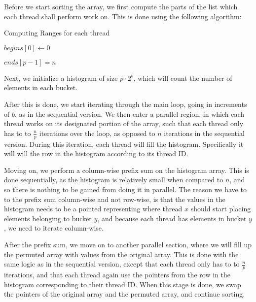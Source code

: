 \documentclass{article}
\begin{document}
Before we start sorting the array, we first compute the parts of the list which each thread shall perform work on. This is done using the following algorithm:


\begin{algorithm}[H]
    \caption{Computing Ranges for each thread}
    \SetAlgoVlined
    
    
    \( begins[0] \gets 0 \)
        

        \( ends[p-1] =n \)
\end{algorithm}

Next, we initialize a histogram of size \( p \cdot  2^{b} \), which will count the number of elements in each bucket.

After this is done, we start iterating through the main loop, going in increments of \( b \), as in the sequential version. We then enter a parallel region, in which each thread works on its designated portion of the array, such that each thread only has to to \( \frac{n}{p}  \) iterations over the loop, as opposed to \( n \) iterations in the sequential version. During this iteration, each thread will fill the histogram. Specifically it will will the row in the histogram according to its thread ID.
\medskip

Moving on, we perform a column-wise prefix sum on the histogram array. This is done sequentially, as the histogram is relatively small when compared to \( n \), and so there is nothing to be gained from doing it in parallel. The reason we have to to the prefix sum column-wise and not row-wise, is that the values in the histogram needs to be a pointed representing where thread \( x \) should start placing elements belonging to bucket \( y \), and because each thread has elements in bucket \( y \), we need to iterate column-wise.
\medskip

After the prefix sum, we move on to another parallel section, where we will fill up the permuted array with values from the original array. This is done with the same logic as in the sequential version, except that each thread only has to to \( \frac{n}{p}  \) iterations, and that each thread again use the pointers from the row in the histogram corresponding to their thread ID. When this stage is done, we swap the pointers of the original array and the permuted array, and continue sorting.
\medskip
\end{document}

